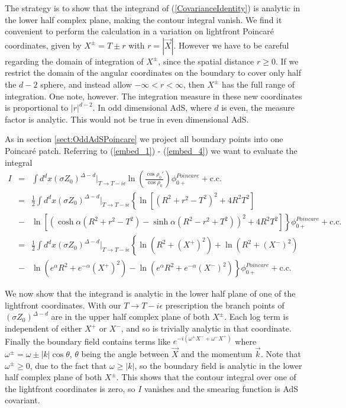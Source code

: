 \documentclass[12pt]{article}
\begin{document}
The strategy is to show that the integrand of
(\ref{CovarianceIdentity}) is analytic in the lower half complex
plane, making the contour integral vanish.  We find it convenient to
perform the calculation in a variation on lightfront Poincar\'e
coordinates, given by $X^\pm = T \pm r$ with $r=|\vec{X}|$.  However
we have to be careful regarding the domain of integration of $X^\pm$,
since the spatial distance $r \ge 0$.  If we restrict the domain of
the angular coordinates on the boundary to cover only half the $d-2$
sphere, and instead allow $-\infty < r < \infty$, then $X^\pm$ has the
full range of integration.  One note, however.  The integration
measure in these new coordinates is proportional to $|r|^{d-2}$.  In
odd dimensional AdS, where $d$ is even, the measure factor is
analytic.  This would not be true in even dimensional AdS.

As in section \ref{sect:OddAdSPoincare} we project all boundary points into one
Poincar\'e patch.  Referring to (\ref{embed_1}) - (\ref{embed_4}) we
want to evaluate the integral
\begin{eqnarray*}
I &=& \int d^dx (\sigma Z_0)^{\Delta - d} \left. \right|_{T \to T - i\epsilon} \ln \left( \frac{\cos \rho_0'}{\cos \rho_0} \right) \phi_{0+}^{Poincare} + \mathrm{c.c.} \\
&=& \frac{1}{2} \int d^dx (\sigma Z_0)^{\Delta - d} \left. \right|_{T \to T - i\epsilon}\left\{ \ln \left[ (R^2 + r^2 - T^2)^2 + 4 R^2 T^2 \right] \right. \\
&-& \left. \ln \left[ \left( \cosh \alpha(R^2 + r^2 - T^2) - \sinh \alpha (R^2 - r^2 + T^2) \right)^2 + 4 R^2 T^2 \right] \right\} \phi_{0+}^{Poincare} + \mathrm{c.c.} \\
&=&\frac{1}{2} \int d^dx (\sigma Z_0)^{\Delta - d} \left. \right|_{T \to T - i\epsilon}\left\{ \ln \left(R^2 + (X^+)^2\right) + \ln \left( R^2 + (X^-)^2 \right) \right. \\
&-&\left. \ln \left( e^\alpha R^2 + e^{-\alpha} (X^+)^2 \right) - \ln \left( e^\alpha R^2 + e^{-\alpha} (X^-)^2 \right) \right\} \phi_{0+}^{Poincare} + \mathrm{c.c.}
\end{eqnarray*}

We now show that the integrand is analytic in the lower half plane of
one of the lightfront coordinates.  With our $T \to T - i\epsilon$
prescription the branch points of $(\sigma Z_0)^{\Delta - d}$ are in
the upper half complex plane of both $X^\pm$.  Each log term is
independent of either $X^+$ or $X^-$, and so is trivially analytic in
that coordinate.  Finally the boundary field contains terms like
$e^{-i(\omega^+ X^- + \omega^- X^+)}$ where $\omega^\pm = \omega \pm
|k| \cos \theta$, $\theta$ being the angle between $\vec{X}$ and the
momentum $\vec{k}$.  Note that $\omega^\pm \ge 0$, due to the fact
that $\omega \ge |k|$, so the boundary field is analytic in the lower
half complex plane of both $X^\pm$.  This shows that the contour
integral over one of the lightfront coordinates is zero, so $I$
vanishes and the smearing function is AdS covariant.
\end{document}
